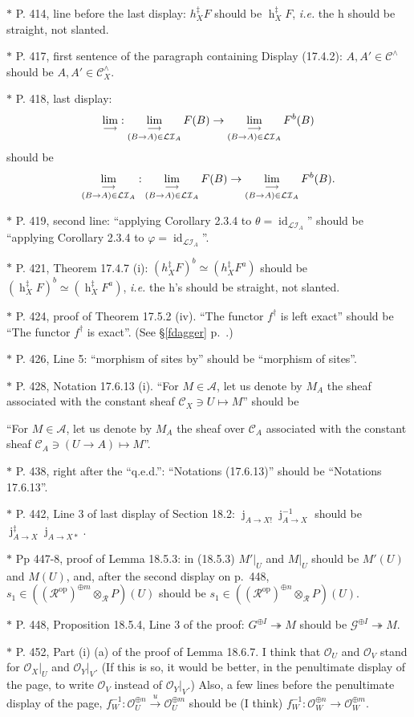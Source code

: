 \documentclass[12pt]{article}%
\theoremstyle{remark}
\theoremstyle{definition}
\newcommand{\nn}{\noindent}
\newcommand{\cc}{\mathcal}
\newcommand{\oo}{\operatorname}
\newcommand{\A}{\mathcal A}
\newcommand{\C}{\mathcal C}
\newcommand{\pp}{\varphi}
\newcommand{\epi}{\twoheadrightarrow}
\newcommand{\xr}{\xrightarrow}
\newcommand{\ilim}{\operatornamewithlimits{\underset{\longrightarrow}{lim}}}
\DeclareMathOperator{\id}{id}
\DeclareMathOperator{\jj}{j}
\DeclareMathOperator{\op}{op}
\begin{document}
\nn$*$ P. 414, line before the last display: $h_X^\ddagger F$ should be $\oo h_X^\ddagger F$, \emph{i.e.} the h should be straight, not slanted. 

\nn$*$ P. 417, first sentence of the paragraph containing Display (17.4.2): $A,A'\in\C^\wedge$ should be $A,A'\in\C_X^\wedge$. 

\nn$*$ P. 418, last display: 
$$
\ilim:\ilim_{(B\to A)\in\cc{LI}_A}F(B)\to\ilim_{(B\to A)\in\cc{LI}_A}F^b(B)
$$ 
should be 
$$
\ilim_{(B\to A)\in\cc{LI}_A}:\ilim_{(B\to A)\in\cc{LI}_A}F(B)\to\ilim_{(B\to A)\in\cc{LI}_A}F^b(B).
$$

\nn$*$ P. 419, second line: ``applying Corollary 2.3.4 to $\theta=\id_{\cc{LI}_A}$'' should be ``applying Corollary 2.3.4 to $\pp=\id_{\cc{LI}_A}$''.

\nn$*$ P. 421, Theorem 17.4.7 (i): $(h_X^\ddagger F)^b\simeq(h_X^\ddagger F^a)$ should be $(\oo h_X^\ddagger F)^b\simeq(\oo h_X^\ddagger F^a)$, \emph{i.e.} the h's should be straight, not slanted.

\noindent $*$ P. 424, proof of Theorem 17.5.2 (iv). ``The functor $f^\dagger$ is left exact'' should be ``The functor $f^\dagger$ is exact''. (See \S\ref{fdagger} p.~\pageref{fdagger}.) 

\noindent $*$ P. 426, Line 5: ``morphism of sites by'' should be ``morphism of sites''.

\nn$*$ P. 428, Notation 17.6.13 (i). ``For $M\in\A$, let us denote by $M_A$ the sheaf associated with the constant sheaf $\C_X\ni U\mapsto M$'' should be  

``For $M\in\A$, let us denote by $M_A$ the sheaf over $\C_A$ associated with the constant sheaf $\C_A\ni(U\to A)\mapsto M$''. 

\noindent $*$ P. 438, right after the ``q.e.d.'': ``Notations (17.6.13)'' should be ``Notations 17.6.13''.

\noindent $*$ P. 442, Line 3 of last display of Section 18.2: $\jj_{A\to X!}\jj_{A\to X}^{-1}$ should be $\jj_{A\to X}^\ddagger\jj_{A\to X*}$.

\noindent $*$ Pp 447-8, proof of Lemma 18.5.3: in (18.5.3) $M'|_U$ and $M|_U$ should be $M'(U)$ and $M(U)$, and, after the second display on p.~448, $s_1\in((\cc R^{\op})^{\oplus m}\otimes_{\cc R}P)(U)$ should be $s_1\in((\cc R^{\op})^{\oplus n}\otimes_{\cc R}P)(U)$.

\noindent $*$ P. 448, Proposition 18.5.4, Line 3 of the proof: $G^{\oplus I}\epi M$ should be $\cc G^{\oplus I}\epi M$.

\noindent $*$ P. 452, Part (i) (a) of the proof of Lemma 18.6.7. I think that $\cc O_U$ and $\cc O_V$ stand for $\cc O_X|_U$ and $\cc O_Y|_V$. (If this is so, it would be better, in the penultimate display of the page, to write $\cc O_V$ instead of $\cc O_Y|_V$.) Also, a few lines before the penultimate display of the page, $f_W^{-1}:\cc O_U^{\oplus n}\xr u\cc O_U^{\oplus m}$ should be (I think) $f_W^{-1}:\cc O_W^{\oplus n}\to\cc O_W^{\oplus m}$.
\end{document}
